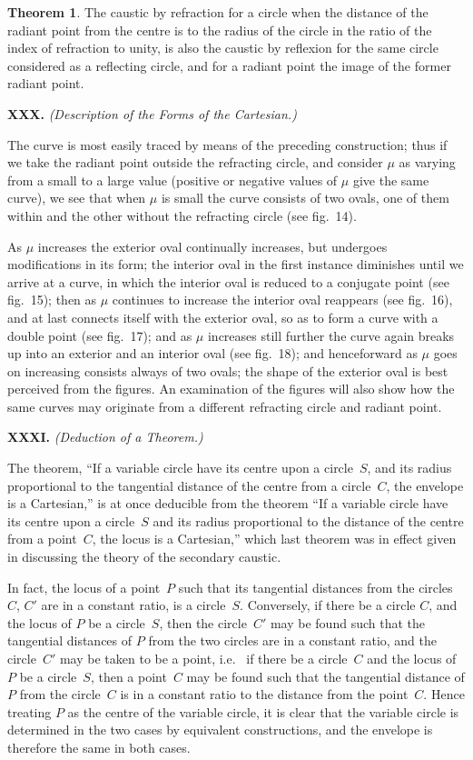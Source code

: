 \documentclass[12pt,a4paper]{article}
\theoremstyle{definition}
\newtheorem*{theorem}{Theorem}
\newcommand{\ie}{i.e.\ }
\begin{document}
\begin{theorem}
The caustic by refraction for a circle when the distance of
the radiant point from the centre is to the radius of the circle
in the ratio of the index of refraction to unity, is also the
caustic by reflexion for the same circle considered as a reflecting
circle, and for a radiant point the image of the former radiant point.
\end{theorem}

\medskip\noindent\textbf{XXX.}
\textit{(Description of the Forms of the Cartesian.)}

The curve is most easily traced by means of the preceding
construction; thus if we take the radiant point outside the
refracting circle, and consider $\mu$ as varying from a small to a
large value (positive or negative values of $\mu$ give the same curve),
we see that when $\mu$ is small the curve consists of two ovals,
one of them within and the other without the refracting circle
(see fig.~14).

As $\mu$ increases the exterior oval continually increases, but
undergoes modifications in its form; the interior oval in the
first instance diminishes until we arrive at a curve, in which
the interior oval is reduced to a conjugate point (see fig.~15);
then as $\mu$ continues to increase the interior oval reappears
(see fig.~16), and at last connects itself with the exterior oval,
so as to form a curve with a double point (see fig.~17);
and as $\mu$ increases still further the curve again breaks up
into an exterior and an interior oval (see fig.~18); and
henceforward as $\mu$ goes on increasing consists always of two ovals;
the shape of the exterior oval is best perceived from the figures.
An examination of the figures will also show how the same
curves may originate from a different refracting circle and radiant point.

\medskip\noindent\textbf{XXXI.}
\textit{(Deduction of a Theorem.)}

The theorem, ``If a variable circle have its centre upon a
circle~$S$, and its radius proportional to the tangential distance
of the centre from a circle~$C$, the envelope is a Cartesian,''
is at once deducible from the theorem ``If a variable circle
have its centre upon a circle~$S$ and its radius proportional to
the distance of the centre from a point~$C$, the locus is a Cartesian,''
which last theorem was in effect given in discussing the theory
of the secondary caustic.

In fact, the locus of a point~$P$ such that its tangential distances
from the circles $C$, $C'$ are in a constant ratio, is a circle~$S$.
Conversely, if there be a circle $C$, and the locus of $P$ be a
circle~$S$, then the circle~$C'$ may be found such that the tangential
distances of $P$ from the two circles are in a constant ratio,
and the circle~$C'$ may be taken to be a point, \ie{} if there be
a circle~$C$ and the locus of $P$ be a circle~$S$, then a point~$C$
may be found such that the tangential distance of $P$ from the
circle~$C$ is in a constant ratio to the distance from the point~$C$.
Hence treating $P$ as the centre of the variable circle, it is clear
that the variable circle is determined in the two cases by
equivalent constructions, and the envelope is therefore the same
in both cases.
\end{document}
